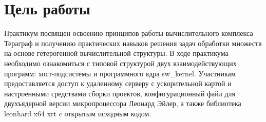 \chapter*{Цель работы}

Практикум посвящен освоению принципов работы вычислительного комплекса Тераграф и получению практических навыков решения задач обработки множеств на основе гетерогенной вычислительной структуры. В ходе практикума необходимо ознакомиться с типовой структурой двух взаимодействующих программ: хост-подсистемы и программного ядра sw\_kernel. Участникам предоставляется доступ к удаленному серверу с ускорительной картой и настроенными средствами сборки проектов, конфигурационный файл для двухъядерной версии микропроцессора Леонард Эйлер, а также библиотека leonhard x64 xrt c открытым исходным кодом.

